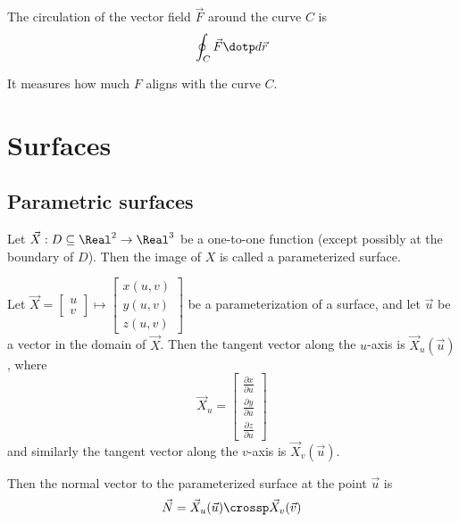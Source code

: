 \begin{definition}[Circulation]
  The circulation of the vector field $\vec{F}$ around the curve $C$ is 
  \[
    \oint_{C} \vec{F} \dotp d\vec{r}
  \]

  It measures how much $F$ aligns with the curve $C$.
\end{definition}

\section{Surfaces}

\subsection{Parametric surfaces}

\begin{definition}
  Let $\vec{X} : D \subseteq \Real^2 \to \Real^3$ be a one-to-one function (except possibly at the boundary of $D$). Then the image of $X$ is called a parameterized surface.
\end{definition}

\begin{definition}
  Let $\vec{X} = \begin{bmatrix}
    u \\
    v
  \end{bmatrix} \mapsto \begin{bmatrix}
    x(u, v) \\
    y(u, v) \\
    z(u, v)
  \end{bmatrix}$ be a parameterization of a surface, and let $\vec{u}$ be a vector in the domain of $\vec{X}$. Then the tangent vector along the $u$-axis is $\vec{X}_u(\vec{u})$, where
  \[
    \vec{X}_u = \begin{bmatrix}
      \frac{\partial x}{\partial u} \\
      \frac{\partial y}{\partial u} \\
      \frac{\partial z}{\partial u}
    \end{bmatrix}
  \]
  and similarly the tangent vector along the $v$-axis is $\vec{X}_v(\vec{u})$.

  Then the normal vector to the parameterized surface at the point $\vec{u}$ is
  \[
    \vec{N} = \vec{X}_u (\vec{u}) \crossp \vec{X}_v (\vec{v})
  \]
\end{definition}

